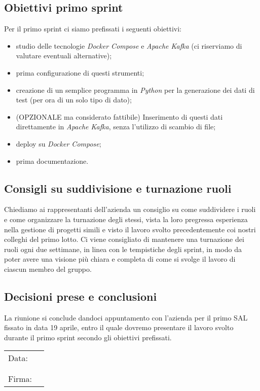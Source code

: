 \documentclass[italian,12pt]{article}
\begin{document}
\subsection{Obiettivi primo sprint}
Per il primo sprint ci siamo prefissati i seguenti obiettivi:
\begin{itemize}
	\item studio delle tecnologie \textit{Docker Compose} e \textit{Apache Kafka} (ci riserviamo di valutare eventuali alternative);
	\item prima configurazione di questi strumenti;
	\item creazione di un semplice programma in \textit{Python} per la generazione dei dati di test (per ora di un solo tipo di dato);
	\item (OPZIONALE ma considerato fattibile) Inserimento di questi dati direttamente in \textit{Apache Kafka}, senza l'utilizzo di scambio di file;
	\item deploy su \textit{Docker Compose};
	\item prima documentazione.
\end{itemize}

\subsection{Consigli su suddivisione e turnazione ruoli}
Chiediamo ai rappresentanti dell'azienda un consiglio su come suddividere i ruoli e come organizzare la turnazione degli stessi, vista la loro pregressa esperienza nella gestione di progetti simili e visto il lavoro svolto precedentemente coi nostri colleghi del primo lotto. Ci viene consigliato di mantenere una turnazione dei ruoli ogni due settimane, in linea con le tempistiche degli sprint, in modo da poter avere una visione più chiara e completa di come si svolge il lavoro di ciascun membro del gruppo.

\subsection{Decisioni prese e conclusioni}
La riunione si conclude dandoci appuntamento con l'azienda per il primo SAL fissato in data 19 aprile, entro il quale dovremo presentare il lavoro svolto durante il primo sprint secondo gli obiettivi prefissati.

\begin{table}[b]
	\begin{tabular}{@{}p{.5in}p{4in}@{}}
		Data:  & \hrulefill \\
			   &     		\\
			   &     		\\
		Firma: & \hrulefill \\
	\end{tabular}
	\end{table}
\end{document}
